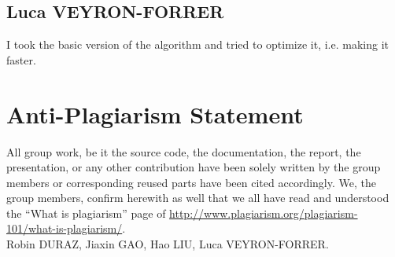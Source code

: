 \documentclass{article}
\begin{document}
\subsection{Luca VEYRON-FORRER}
I took the basic version of the algorithm and tried to optimize it, i.e. making
it faster.

\section{Anti-Plagiarism Statement}
All group work, be it the source code, the documentation, the report, the presentation, or any other contribution have been solely written by the group members or corresponding reused parts have been cited accordingly. We, the group members, confirm herewith as well that we all have read and understood the ``What is plagiarism'' page of \url{http://www.plagiarism.org/plagiarism-101/what-is-plagiarism/}.\\


Robin DURAZ, Jiaxin GAO, Hao LIU, Luca VEYRON-FORRER.
\end{document}
